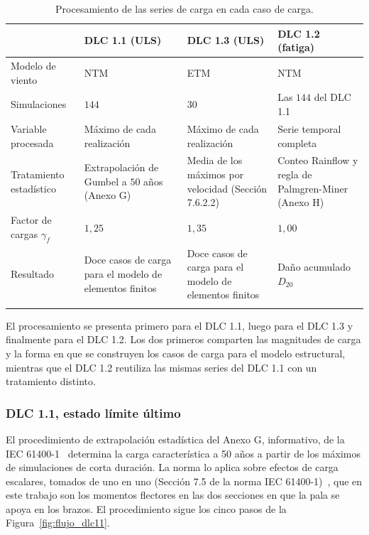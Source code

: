 \begin{table}[H]
    \centering
    \caption{Procesamiento de las series de carga en cada caso de carga.}
    \label{tab:procesamiento_dlc}
    \small
    \begin{tabular}{>{\raggedright\arraybackslash}p{3.4cm}>{\raggedright\arraybackslash}p{3.65cm}>{\raggedright\arraybackslash}p{3.65cm}>{\raggedright\arraybackslash}p{3.65cm}}
        \hline
         & \textbf{DLC 1.1 (ULS)} & \textbf{DLC 1.3 (ULS)} & \textbf{DLC 1.2 (fatiga)} \\
        \hline
        Modelo de viento & NTM & ETM & NTM \\
        Simulaciones & $144$ & $30$ & Las $144$ del DLC 1.1 \\
        Variable procesada & Máximo de cada realización & Máximo de cada realización & Serie temporal completa \\
        Tratamiento estadístico & Extrapolación de Gumbel a $50$ años (Anexo G) & Media de los máximos por velocidad (Sección 7.6.2.2) & Conteo Rainflow y regla de Palmgren-Miner (Anexo H) \\
        Factor de cargas $\gamma_f$ & $1{,}25$ & $1{,}35$ & $1{,}00$ \\
        Resultado & Doce casos de carga para el modelo de elementos finitos & Doce casos de carga para el modelo de elementos finitos & Daño acumulado $D_{20}$ \\
        \hline
        \multicolumn{4}{l}{\footnotesize Secciones y anexos de la norma IEC 61400-1.}\\
    \end{tabular}
\end{table}

El procesamiento se presenta primero para el DLC 1.1, luego para el DLC 1.3 y finalmente para el DLC 1.2. Los dos primeros comparten las magnitudes de carga y la forma en que se construyen los casos de carga para el modelo estructural, mientras que el DLC 1.2 reutiliza las mismas series del DLC 1.1 con un tratamiento distinto.

\subsubsection{DLC 1.1, estado límite último}
\label{sec:anexo_f}

El procedimiento de extrapolación estadística del Anexo G, informativo, de la IEC 61400-1~\parencite*{IEC61400-1} determina la carga característica a 50 años a partir de los máximos de simulaciones de corta duración. La norma lo aplica sobre efectos de carga escalares, tomados de uno en uno (Sección 7.5 de la norma IEC 61400-1)~\parencite*{IEC61400-1}, que en este trabajo son los momentos flectores en las dos secciones en que la pala se apoya en los brazos. El procedimiento sigue los cinco pasos de la Figura~\ref{fig:flujo_dlc11}.

